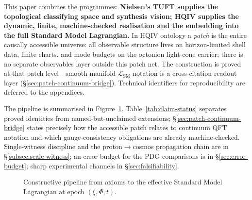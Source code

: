 \documentclass[11pt]{amsart}
\begin{document}
This paper combines the programmes: \textbf{Nielsen's TUFT supplies the topological classifying space and synthesis vision; HQIV supplies the dynamic, finite, machine-checked realisation and the embedding into the full Standard Model Lagrangian.} In HQIV ontology a \emph{patch} is the entire causally accessible universe: all observable structure lives on horizon-limited shell data, finite charts, and mode budgets on the octonion light-cone carrier; there is no separate observables layer outside this patch net. The construction is proved at that patch level---smooth-manifold $\mathcal{L}_{\mathrm{SM}}$ notation is a cross-citation readout layer (§\ref{sec:patch-continuum-bridge}). Technical identifiers for reproducibility are deferred to the appendices.

The pipeline is summarised in Figure~\ref{fig:pipeline}. Table~\ref{tab:claim-status} separates proved identities from named-but-unclaimed extensions; §\ref{sec:patch-continuum-bridge} states precisely how the accessible patch relates to continuum QFT notation and which gauge-consistency obligations are already machine-checked. Single-witness discipline and the proton$\to$cosmos propagation chain are in \S\ref{subsec:scale-witness}; an error budget for the PDG comparisons is in \S\ref{sec:error-budget}; sharp experimental channels in \S\ref{sec:falsifiability}.

\begin{figure}[ht]
  \centering
  \small
  \caption{Constructive pipeline from axioms to the effective Standard Model Lagrangian at epoch $(\xi,\Phi,t)$.}
  \label{fig:pipeline}
\end{figure}
\end{document}

